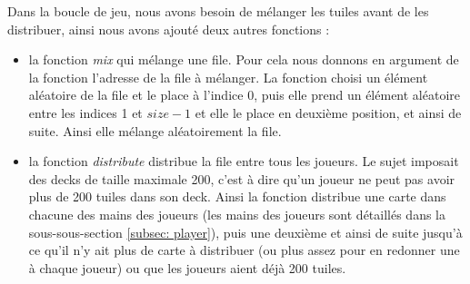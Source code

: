 \documentclass[11pt]{article}
\begin{document}
\begin{figure}[H]
\centering
{}
\end{figure}

Dans la boucle de jeu, nous avons besoin de mélanger les tuiles avant de les distribuer, ainsi nous avons ajouté deux autres fonctions : \\
\begin{itemize}
    \item la fonction \emph{mix} qui mélange une file. Pour cela nous donnons en argument de la fonction l'adresse de la file à mélanger. La fonction choisi un élément aléatoire de la file et le place à l'indice 0, puis elle prend un élément aléatoire entre les indices 1 et \(size - 1\) et elle le place en deuxième position, et ainsi de suite. Ainsi elle mélange aléatoirement la file.
    \item la fonction \emph{distribute} distribue la file entre tous les joueurs. Le sujet imposait des decks de taille maximale 200, c'est à dire qu'un joueur ne peut pas avoir plus de 200 tuiles dans son deck. Ainsi la fonction distribue une carte dans chacune des mains des joueurs (les mains des joueurs sont détaillés dans la sous-sous-section \ref{subsec: player}), puis une deuxième et ainsi de suite jusqu'à ce qu'il n'y ait plus de carte à distribuer (ou plus assez pour en redonner une à chaque joueur) ou que les joueurs aient déjà 200 tuiles. \\
\end{itemize}
\end{document}
